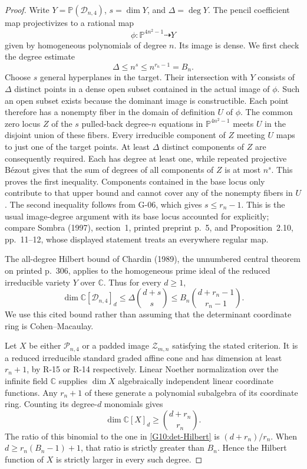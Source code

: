 \documentclass[11pt,a4paper]{article}
\theoremstyle{definition}\newtheorem{definition}{Definition}
\begin{document}
\begin{proof}
Write $Y=\mathbb P(\mathcal D_{n,4})$, $s=\dim Y$, and
$\Delta=\deg Y$. The pencil coefficient map projectivizes to a
rational map
\[
 \phi:\mathbb P^{4n^2-1}\dashrightarrow Y
\]
given by homogeneous polynomials of degree $n$. Its image is dense.
We first check the degree estimate
\begin{equation}\label{G10:image-degree}
 \Delta\leq n^s\leq n^{r_n-1}=B_n.
\end{equation}
Choose $s$ general hyperplanes in the target. Their intersection
with $Y$ consists of $\Delta$ distinct points in a dense open subset
contained in the actual image of $\phi$. Such an open subset exists
because the dominant image is constructible. Each point therefore
has a nonempty fiber in the domain of definition $U$ of $\phi$.
The common zero locus $Z$ of the $s$ pulled-back degree-$n$
equations in $\mathbb P^{4n^2-1}$ meets $U$ in the disjoint union
of these fibers. Every irreducible component of $Z$ meeting $U$
maps to just one of the target points. At least $\Delta$ distinct
components of $Z$ are consequently required. Each has degree at
least one, while repeated projective B\'ezout gives that the sum
of degrees of all components of $Z$ is at most $n^s$.
This proves the first inequality. Components contained in the
base locus only contribute to that upper bound and cannot cover
any of the nonempty fibers in $U$.
The second inequality follows from G-06, which gives $s\leq r_n-1$.
This is the usual image-degree argument with its base locus
accounted for explicitly; compare Sombra (1997), section~1,
printed preprint p.~5, and Proposition~2.10, pp.~11--12,
whose displayed statement treats an everywhere regular map.

The all-degree Hilbert bound of Chardin (1989), the unnumbered
central theorem on printed p.~306, applies to the homogeneous
prime ideal of the reduced irreducible variety $Y$ over
$\mathbb C$. Thus for every $d\geq1$,
\begin{equation}\label{G10:det-Hilbert}
 \dim\mathbb C[\mathcal D_{n,4}]_d
 \leq\Delta\binom{d+s}{s}
 \leq B_n\binom{d+r_n-1}{r_n-1}.
\end{equation}
We use this cited bound rather than assuming that the determinant
coordinate ring is Cohen--Macaulay.

Let $X$ be either $\mathcal P_{n,4}$ or a padded image
$\mathcal Z_{m,n}$ satisfying the stated criterion. It is a
reduced irreducible standard graded affine cone and has dimension
at least $r_n+1$, by R-15 or R-14 respectively. Linear Noether
normalization over the infinite field $\mathbb C$ supplies
$\dim X$ algebraically independent linear coordinate functions.
Any $r_n+1$ of these generate a polynomial subalgebra of its
coordinate ring. Counting its degree-$d$ monomials gives
\begin{equation}\label{G10:per-Hilbert}
 \dim\mathbb C[X]_d\geq\binom{d+r_n}{r_n}.
\end{equation}
The ratio of this binomial to the one in
\eqref{G10:det-Hilbert} is $(d+r_n)/r_n$.
When $d\geq r_n(B_n-1)+1$, that ratio is strictly greater
than $B_n$. Hence the Hilbert function of $X$ is strictly larger
in every such degree.


\end{proof}
\end{document}
